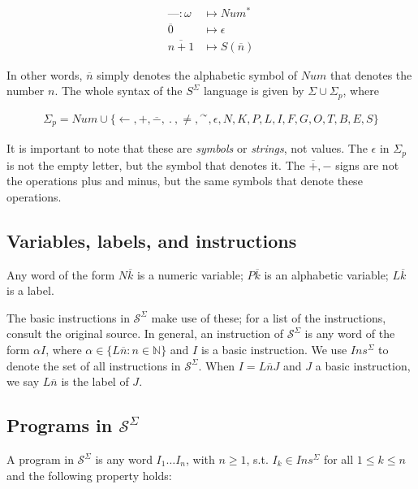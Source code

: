\documentclass[a4paper, 12pt]{article}
\begin{document}
\begin{align*}
    \text{---} : \omega &\mapsto  Num^{*}  \\ 
    \overline{0} & \mapsto \epsilon \\ 
    \overline{n + 1} &\mapsto S(\overline{n})
\end{align*}

In other words, $\overline{n}$ simply denotes the alphabetic symbol of $Num$
that denotes the number $n$. The whole syntax of the $S^{\Sigma}$ language is
given by $\Sigma \cup \Sigma_p$, where

\begin{align*}
    \Sigma_p = Num \cup \{ \leftarrow, +, \overline{-}, ~ . ~, \neq, {}^{\curvearrowright},
    \epsilon, N, K, P, L, I, F, G, O, T, B, E, S \}
\end{align*}

It is important to note that these are \textit{symbols} or \textit{strings}, not
values. The $\epsilon$ in $\Sigma_p$ is not the empty letter, but the symbol
that denotes it. The $\overline{+}, -$ signs are not the operations plus and
minus, but the same symbols that denote these operations. 

\subsection{Variables, labels, and instructions}

Any word of the form $N \overline{k}$ is a numeric variable; $P \overline{k}$ is
an alphabetic variable; $L \overline{k}$ is a label.

The basic instructions in $\mathcal{S}^{\Sigma}$ make use of these; for a list
of the instructions, consult the original source. In general, an instruction of
$\mathcal{S}^{\Sigma}$ is any word of the form $\alpha I$, where $\alpha \in \{L
\overline{n}: n \in \mathbb{N}\}$ and $I$ is a basic instruction. We use
$Ins^{\Sigma}$ to denote the set of all instructions in $\mathcal{S}^{\Sigma}$.
When $I = L \overline{n} J$ and $J$ a basic instruction, we say $L \overline{n}$
is the label of $J$.

\subsection{Programs in $\mathcal{S}^{\Sigma}$}

A program in $\mathcal{S}^{\Sigma}$ is any word $I_1 \ldots I_n$, with $n \geq
1$, s.t. $I_k \in Ins^{\Sigma}$ for all $1 \leq k \leq n$ and the following
property holds:
\end{document}
